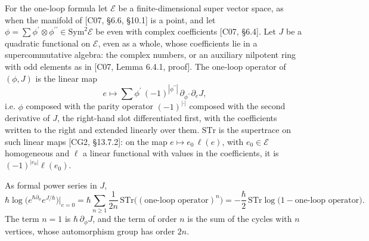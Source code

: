 For the one-loop formula let $\mathscr E$ be a finite-dimensional super vector space, as when the manifold of [C07, §6.6, §10.1] is a point, and let $\phi=\sum\phi^{\prime}\otimes\phi^{\prime\prime}\in\mathrm{Sym}^2\mathscr E$ be even with complex coefficients [C07, §6.4]. Let $J$ be a quadratic functional on $\mathscr E$, even as a whole, whose coefficients lie in a supercommutative algebra: the complex numbers, or an auxiliary nilpotent ring with odd elements as in [C07, Lemma 6.4.1, proof]. The one-loop operator of $(\phi,J)$ is the linear map
\[
e\mapsto\sum\phi^{\prime}\,(-1)^{|\phi^{\prime\prime}|}\,\partial_{\phi^{\prime\prime}}\partial_eJ ,
\]
i.e. $\phi$ composed with the parity operator $(-1)^{|\cdot|}$ composed with the second derivative of $J$, the right-hand slot differentiated first, with the coefficients written to the right and extended linearly over them. $\mathrm{STr}$ is the supertrace on such linear maps [CG2, §13.7.2]: on the map $e\mapsto e_0\,\ell(e)$, with $e_0\in\mathscr E$ homogeneous and $\ell$ a linear functional with values in the coefficients, it is $(-1)^{|e_0|}\ell(e_0)$.

\begin{proposition}
\label{prop:c3-oneloop}
As formal power series in $J$,
\begin{equation}
\hbar\log\big(e^{\hbar\partial_\phi}e^{J/\hbar}\big)\Big|_{e=0}=\hbar\sum_{n\ge1}\frac1{2n}\,\mathrm{STr}\big((\text{one-loop operator})^n\big)=-\frac\hbar2\,\mathrm{STr}\log\big(1-\text{one-loop operator}\big).
\label{eq:c3-oneloop}
\end{equation}
The term $n=1$ is $\hbar\,\partial_\phi J$, and the term of order $n$ is the sum of the cycles with $n$ vertices, whose automorphism group has order $2n$.
\end{proposition}

